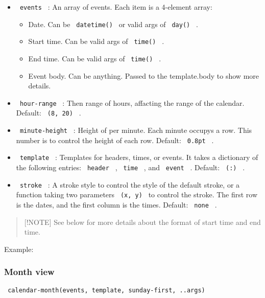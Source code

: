 \begin{itemize}
\tightlist
\item
  \texttt{\ events\ } : An array of events. Each item is a 4-element
  array:

  \begin{itemize}
  \tightlist
  \item
    Date. Can be \texttt{\ datetime()\ } or valid args of
    \texttt{\ day()\ } .
  \item
    Start time. Can be valid args of \texttt{\ time()\ } .
  \item
    End time. Can be valid args of \texttt{\ time()\ } .
  \item
    Event body. Can be anything. Passed to the template.body to show
    more details.
  \end{itemize}
\item
  \texttt{\ hour-range\ } : Then range of hours, affacting the range of
  the calendar. Default: \texttt{\ (8,\ 20)\ } .
\item
  \texttt{\ minute-height\ } : Height of per minute. Each minute occupys
  a row. This number is to control the height of each row. Default:
  \texttt{\ 0.8pt\ } .
\item
  \texttt{\ template\ } : Templates for headers, times, or events. It
  takes a dictionary of the following entries: \texttt{\ header\ } ,
  \texttt{\ time\ } , and \texttt{\ event\ } . Default: \texttt{\ (:)\ }
  .
\item
  \texttt{\ stroke\ } : A stroke style to control the style of the
  default stroke, or a function taking two parameters
  \texttt{\ (x,\ y)\ } to control the stroke. The first row is the
  dates, and the first column is the times. Default: \texttt{\ none\ } .
\end{itemize}

\begin{quote}
{[}!NOTE{]} See below for more details about the format of start time
and end time.
\end{quote}

Example:


\subsubsection{Month view}\label{month-view}

\texttt{\ calendar-month(events,\ template,\ sunday-first,\ ..args)\ }


